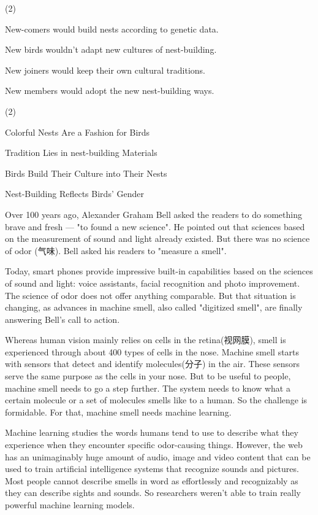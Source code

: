\documentclass{英语试卷}
\begin{document}
\begin{choices}(2)
  \item New-comers would build nests according to genetic data.
  \item New birds wouldn't adapt new cultures of nest-building.
  \item New joiners would keep their own cultural traditions.
  \item New members would adopt the new nest-building ways.
\end{choices}
\begin{choices}(2)
  \item Colorful Nests Are a Fashion for Birds
  \item Tradition Lies in nest-building Materials
  \item Birds Build Their Culture into Their Nests
  \item Nest-Building Reflects Birds' Gender
\end{choices}
\par Over 100 years ago, Alexander Graham Bell asked the readers to do something brave and fresh — "to found a new science". He pointed out that sciences based on the measurement of sound and light already existed. But there was no science of odor (气味). Bell asked his readers to "measure a smell".\par
\par Today, smart phones provide impressive built-in capabilities based on the sciences of sound and light: voice assistants, facial recognition and photo improvement. The science of odor does not offer anything comparable. But that situation is changing, as advances in machine smell, also called "digitized smell", are finally answering Bell's call to action.\par
\par Whereas human vision mainly relies on cells in the retina(视网膜), smell is experienced through about 400 types of cells in the nose. Machine smell starts with sensors that detect and identify molecules(分子) in the air. These sensors serve the same purpose as the cells in your nose. But to be useful to people, machine smell needs to go a step further. The system needs to know what a certain molecule or a set of molecules smells like to a human. So the challenge is formidable. For that, machine smell needs machine learning.\par
\par Machine learning studies the words humans tend to use to describe what they experience when they encounter specific odor-causing things. However, the web has an unimaginably huge amount of audio, image and video content that can be used to train artificial intelligence systems that recognize sounds and pictures. Most people cannot describe smells in word as effortlessly and recognizably as they can describe sights and sounds. So researchers weren't able to train really powerful machine learning models.\par
\end{document}
